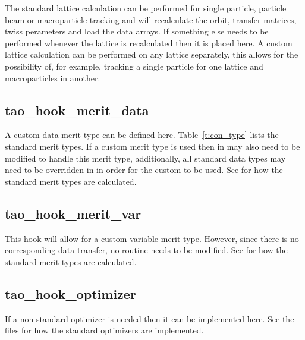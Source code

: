 {The standard lattice calculation can be performed for single particle,
particle beam or macroparticle tracking and will recalculate the
orbit, transfer matrices, twiss perameters and load the data
arrays. If something else needs to be performed whenever the lattice
is recalculated then it is placed here. A custom lattice calculation
can be performed on any lattice separately, this allows for the
possibility of, for example, tracking a single particle for one
lattice and macroparticles in another.

\subsection{tao\_hook\_merit\_data}

A custom data merit type can be defined here. Table~\ref{t:con_type}
lists the standard merit types. If a custom merit type is used then
 in  may also need to be
modified to handle this merit type, additionally, all standard data
types may need to be overridden in  in
order for the custom  to be used.  See
 for how the standard merit types are
calculated.

\subsection{tao\_hook\_merit\_var}

This hook will allow for a custom variable merit type. However, since
there is no corresponding data transfer, no  routine needs
to be modified.  See  for how the standard
merit types are calculated.

\subsection{tao\_hook\_optimizer}

If a non standard optimizer is needed then it can be implemented
here. See the  files for how the
standard optimizers are implemented.

}
